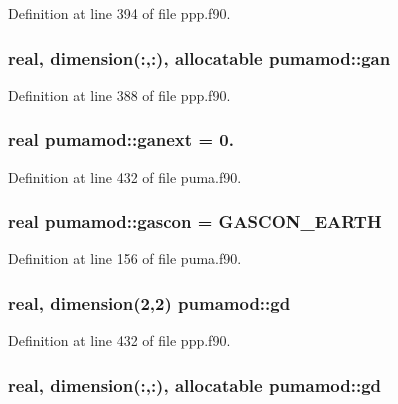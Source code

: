 \-Definition at line 394 of file ppp.\-f90.

\hypertarget{classpumamod_aa15249f48df29a85f239fb007058eacb}{
\subsubsection[{gan}]{\setlength{\rightskip}{0pt plus 5cm}real, dimension(\-:,\-:), allocatable {\bf pumamod\-::gan}}}
\label{classpumamod_aa15249f48df29a85f239fb007058eacb}


\-Definition at line 388 of file ppp.\-f90.

\hypertarget{classpumamod_a936da81a07a9bfa83bea326d29f5a5d9}{
\subsubsection[{ganext}]{\setlength{\rightskip}{0pt plus 5cm}real {\bf pumamod\-::ganext} = 0.}}
\label{classpumamod_a936da81a07a9bfa83bea326d29f5a5d9}


\-Definition at line 432 of file puma.\-f90.

\hypertarget{classpumamod_ae3f731196cc45fe58378593cedcbb674}{
\subsubsection[{gascon}]{\setlength{\rightskip}{0pt plus 5cm}real {\bf pumamod\-::gascon} = \-G\-A\-S\-C\-O\-N\-\_\-\-E\-A\-R\-T\-H}}
\label{classpumamod_ae3f731196cc45fe58378593cedcbb674}


\-Definition at line 156 of file puma.\-f90.

\hypertarget{classpumamod_a00b4d8ae29f6999627d3b93cdfcec1ea}{
\subsubsection[{gd}]{\setlength{\rightskip}{0pt plus 5cm}real, dimension(2,2) {\bf pumamod\-::gd}}}
\label{classpumamod_a00b4d8ae29f6999627d3b93cdfcec1ea}


\-Definition at line 432 of file ppp.\-f90.

\hypertarget{classpumamod_a50103ebf2d2ba2366f2eca07abaabeb4}{
\subsubsection[{gd}]{\setlength{\rightskip}{0pt plus 5cm}real, dimension(\-:,\-:), allocatable {\bf pumamod\-::gd}}}
\label{classpumamod_a50103ebf2d2ba2366f2eca07abaabeb4}


